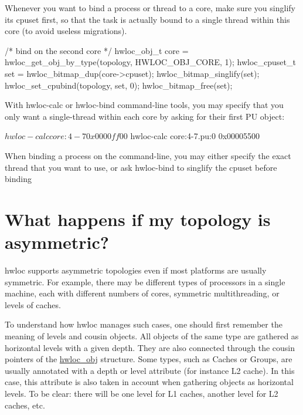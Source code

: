 Whenever you want to bind a process or thread to a core, make sure you singlify its cpuset first, so that the task is actually bound to a single thread within this core (to avoid useless migrations). \begin{DoxyVerb}
/* bind on the second core */
hwloc_obj_t core = hwloc_get_obj_by_type(topology, HWLOC_OBJ_CORE, 1);
hwloc_cpuset_t set = hwloc_bitmap_dup(core->cpuset);
hwloc_bitmap_singlify(set);
hwloc_set_cpubind(topology, set, 0);
hwloc_bitmap_free(set);
\end{DoxyVerb}


With hwloc-\/calc or hwloc-\/bind command-\/line tools, you may specify that you only want a single-\/thread within each core by asking for their first PU object: \begin{DoxyVerb}
$ hwloc-calc core:4-7
0x0000ff00
$ hwloc-calc core:4-7.pu:0
0x00005500
\end{DoxyVerb}


When binding a process on the command-\/line, you may either specify the exact thread that you want to use, or ask hwloc-\/bind to singlify the cpuset before binding 
\hypertarget{a00011_faq_asymmetric}{}\section{What happens if my topology is asymmetric?}\label{a00011_faq_asymmetric}
hwloc supports asymmetric topologies even if most platforms are usually symmetric. For example, there may be different types of processors in a single machine, each with different numbers of cores, symmetric multithreading, or levels of caches.

To understand how hwloc manages such cases, one should first remember the meaning of levels and cousin objects. All objects of the same type are gathered as horizontal levels with a given depth. They are also connected through the cousin pointers of the \hyperlink{a00016}{hwloc\_\-obj} structure. Some types, such as Caches or Groups, are usually annotated with a depth or level attribute (for instance L2 cache). In this case, this attribute is also taken in account when gathering objects as horizontal levels. To be clear: there will be one level for L1 caches, another level for L2 caches, etc.

